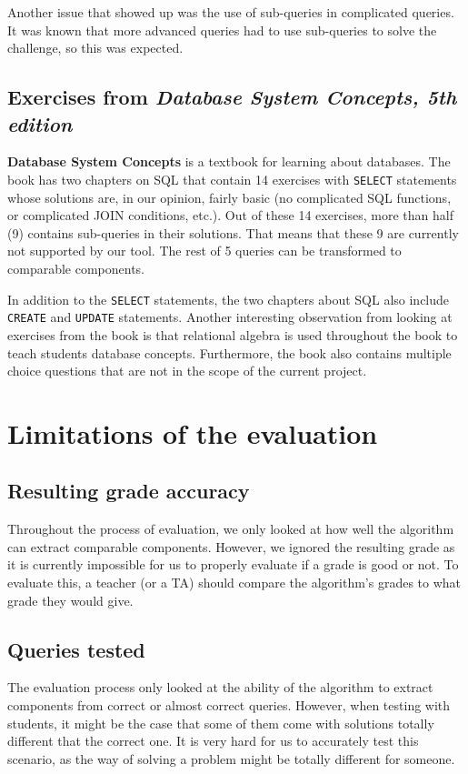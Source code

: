 Another issue that showed up was the use of sub-queries in complicated queries. It was known that more advanced queries had to use sub-queries to solve the challenge, so this was expected.

\subsection{Exercises from \textit{Database System Concepts, 5th edition}}

\textbf{Database System Concepts} is a textbook for learning about databases. The book has two chapters on SQL that contain 14 exercises with \texttt{SELECT} statements whose solutions are, in our opinion, fairly basic (no complicated SQL functions, or complicated JOIN conditions, etc.). Out of these 14 exercises, more than half (9) contains sub-queries in their solutions. That means that these 9 are currently not supported by our tool. The rest of 5 queries can be transformed to comparable components.

In addition to the \texttt{SELECT} statements, the two chapters about SQL also include \texttt{CREATE} and \texttt{UPDATE} statements. Another interesting observation from looking at exercises from the book is that relational algebra is used throughout the book to teach students database concepts. Furthermore, the book also contains multiple choice questions that are not in the scope of the current project.

\section{Limitations of the evaluation}
\subsection{Resulting grade accuracy}
Throughout the process of evaluation, we only looked at how well the algorithm can extract comparable components. However, we ignored the resulting grade as it is currently impossible for us to properly evaluate if a grade is good or not. To evaluate this, a teacher (or a TA) should compare the algorithm's grades to what grade they would give.

\subsection{Queries tested}
The evaluation process only looked at the ability of the algorithm to extract components from correct or almost correct queries. However, when testing with students, it might be the case that some of them come with solutions totally different that the correct one. It is very hard for us to accurately test this scenario, as the way of solving a problem might be totally different for someone.

